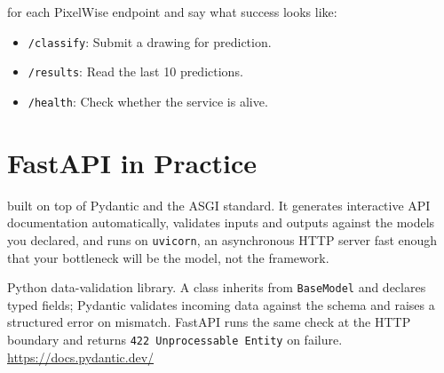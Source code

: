 
 for each PixelWise endpoint and say what
success looks like:
\begin{itemize}
    \item \texttt{/classify}: Submit a drawing for prediction.
    \item \texttt{/results}: Read the last 10 predictions.
    \item \texttt{/health}: Check whether the service is alive.
\end{itemize}






\newpage
\section{FastAPI in Practice}

 built on top of
Pydantic and the ASGI standard.
It generates interactive API documentation automatically, validates inputs
and outputs against the models you declared, and runs on \texttt{uvicorn}, an
asynchronous HTTP server fast enough that your bottleneck will be the model,
not the framework.

Python data-validation library. A class inherits from \texttt{BaseModel}
and declares typed fields; Pydantic validates incoming data against the
schema and raises a structured error on mismatch. FastAPI runs the same
check at the HTTP boundary and returns
\texttt{422 Unprocessable Entity} on failure.\\
\url{https://docs.pydantic.dev/}


